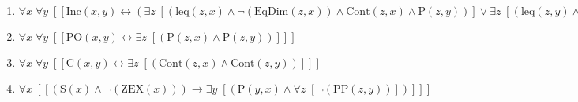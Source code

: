 \documentclass{article}
\begin{document}
\begin{enumerate}
\item $\forall x\; \forall y\;  \left[ \left[ \textrm{Inc}(x,y) \leftrightarrow \left(\exists z\;  \left[ \left(\textrm{leq}(z,x) \land \neg \left(\textrm{EqDim}(z,x)\right) \land \textrm{Cont}(z,x) \land \textrm{P}(z,y)\right) \right] \lor \exists z\;  \left[ \left(\textrm{leq}(z,y) \land \neg \left(\textrm{EqDim}(z,y)\right) \land \textrm{Cont}(z,y) \land \textrm{P}(z,x)\right) \right]\right) \right] \right]$
\item $\forall x\; \forall y\;  \left[ \left[ \textrm{PO}(x,y) \leftrightarrow \exists z\;  \left[ \left(\textrm{P}(z,x) \land \textrm{P}(z,y)\right) \right] \right] \right]$
\item $\forall x\; \forall y\;  \left[ \left[ \textrm{C}(x,y) \leftrightarrow \exists z\;  \left[ \left(\textrm{Cont}(z,x) \land \textrm{Cont}(z,y)\right) \right] \right] \right]$
\item $\forall x\;  \left[ \left[ \left(\textrm{S}(x) \land \neg \left(\textrm{ZEX}(x)\right)\right) \rightarrow \exists y\;  \left[ \left(\textrm{P}(y,x) \land \forall z\;  \left[ \neg \left(\textrm{PP}(z,y)\right) \right]\right) \right] \right] \right]$
\end{enumerate}
\end{document}
